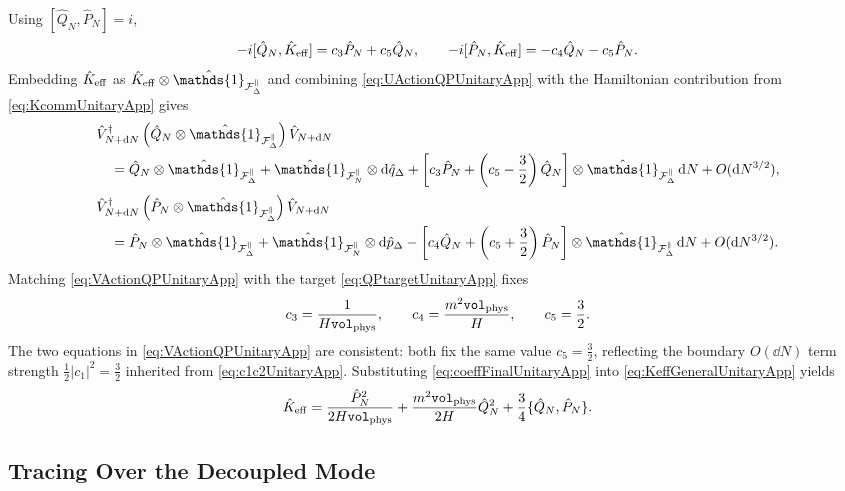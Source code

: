 \documentclass{article}
\def\cF{{\cal F}}
\newcommand{\openone}{\hat{\mathds{1}}}
\newcommand{\Vphys}{\mathtt{vol}_{\rm phys}}
\numberwithin{equation}{section}
\begin{document}
	Using \([\hat Q_N,\hat P_N]=i\),
	\begin{equation}
		-i[\hat Q_N,\hat K_{\rm eff}] = c_3\hat P_N+c_5\hat Q_N, \qquad -i[\hat P_N,\hat K_{\rm eff}] = -c_4\hat Q_N-c_5\hat P_N.
		\label{eq:KcommUnitaryApp}
	\end{equation}
	Embedding \(\hat K_{\rm eff}\) as \(\hat K_{\rm eff}\otimes\openone_{\cF_\Delta^\parallel}\) and combining \cref{eq:UActionQPUnitaryApp} with the Hamiltonian contribution from \cref{eq:KcommUnitaryApp} gives
	\begin{align}
		&\hat V_{N+\dd N}^\dagger \left( \hat Q_N\otimes\openone_{\cF_\Delta^\parallel} \right) \hat V_{N+\dd N} \nonumber\\ &\quad = \hat Q_N\otimes\openone_{\cF_\Delta^\parallel} + \openone_{\cF_N^\parallel}\otimes \dd\hat q_\Delta + \left[ c_3\hat P_N + \left( c_5-\frac32 \right)\hat Q_N \right] \otimes\openone_{\cF_\Delta^\parallel}\,\dd N + O(\dd N^{3/2}), \nonumber\\[2pt] &\hat V_{N+\dd N}^\dagger \left( \hat P_N\otimes\openone_{\cF_\Delta^\parallel} \right) \hat V_{N+\dd N} \nonumber\\ &\quad = \hat P_N\otimes\openone_{\cF_\Delta^\parallel} + \openone_{\cF_N^\parallel}\otimes \dd\hat p_\Delta - \left[ c_4\hat Q_N + \left( c_5+\frac32 \right)\hat P_N \right] \otimes\openone_{\cF_\Delta^\parallel}\,\dd N + O(\dd N^{3/2}).
		\label{eq:VActionQPUnitaryApp}
	\end{align}
	Matching \cref{eq:VActionQPUnitaryApp} with the target \cref{eq:QPtargetUnitaryApp} fixes
	\begin{equation}
		c_3=\frac{1}{H\Vphys}, \qquad c_4=\frac{m^2\Vphys}{H}, \qquad c_5=\frac32.
		\label{eq:coeffFinalUnitaryApp}
	\end{equation}
	The two equations in \cref{eq:VActionQPUnitaryApp} are consistent: both fix the same value \(c_5=\tfrac32\), reflecting the boundary \(O(\dd N)\) term strength \(\tfrac12|c_1|^2=\tfrac32\) inherited from \cref{eq:c1c2UnitaryApp}. Substituting \cref{eq:coeffFinalUnitaryApp} into \cref{eq:KeffGeneralUnitaryApp} yields
	\begin{equation}
		\hat K_{\rm eff} = \frac{\hat P_N^2}{2H\Vphys} + \frac{m^2\Vphys}{2H}\hat Q_N^2 + \frac{3}{4}\{\hat Q_N,\hat P_N\}.
		\label{eq:KeffFinal}
	\end{equation}

	\subsection{Tracing Over the Decoupled Mode}
	\label{appA:tracing}
\end{document}
